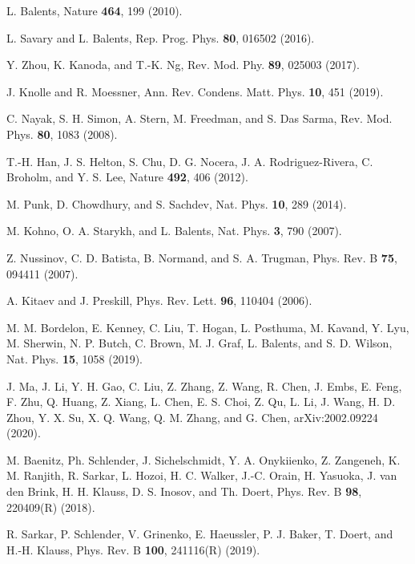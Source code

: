 \documentclass[aps,twocolumn,superscriptaddress,showpacs]{revtex4-1}
\begin{document}
\begin{thebibliography}{}

L. Balents, Nature {\bf 464}, 199 (2010).

L. Savary and L. Balents, Rep. Prog. Phys. {\bf 80}, 016502 (2016).

Y. Zhou, K. Kanoda, and T.-K. Ng, Rev. Mod. Phy. {\bf 89}, 025003 (2017).

J. Knolle and R. Moessner, Ann. Rev. Condens. Matt. Phys. {\bf 10}, 451 (2019).

C. Nayak, S. H. Simon, A. Stern, M. Freedman, and S. Das Sarma, Rev. Mod. Phys. {\bf 80}, 1083 (2008).

T.-H. Han, J. S. Helton, S. Chu, D. G. Nocera, J. A. Rodriguez-Rivera, C. Broholm, and Y. S. Lee, Nature {\bf 492}, 406 (2012).

M. Punk, D. Chowdhury, and S. Sachdev, Nat. Phys. {\bf 10}, 289 (2014).

M. Kohno, O. A. Starykh, and L. Balents, Nat. Phys. {\bf 3}, 790 (2007).

Z. Nussinov, C. D. Batista, B. Normand, and S. A. Trugman, Phys. Rev. B {\bf 75}, 094411 (2007).

A. Kitaev and J. Preskill, Phys. Rev. Lett. {\bf 96}, 110404 (2006).

M. M. Bordelon, E. Kenney, C. Liu, T. Hogan, L. Posthuma, M. Kavand, Y. Lyu, M. Sherwin, N. P.
Butch, C. Brown, M. J. Graf, L. Balents, and S. D. Wilson, Nat. Phys. {\bf 15}, 1058 (2019).

J. Ma, J. Li, Y. H. Gao, C. Liu, Z. Zhang, Z. Wang, R. Chen, J. Embs, E. Feng, F. Zhu, Q. Huang, Z. Xiang, L. Chen, E. S. Choi, Z. Qu, L. Li, J. Wang, H. D. Zhou, Y. X. Su, X. Q. Wang, Q. M. Zhang, and G. Chen, arXiv:2002.09224 (2020).

M. Baenitz, Ph. Schlender, J. Sichelschmidt, Y. A. Onykiienko, Z. Zangeneh, K. M. Ranjith, R. Sarkar, L. Hozoi, H. C. Walker, J.-C. Orain, H. Yasuoka, J. van den Brink, H. H. Klauss, D. S. Inosov, and Th. Doert, Phys. Rev. B {\bf 98}, 220409(R) (2018).

R. Sarkar, P. Schlender, V. Grinenko, E. Haeussler, P. J. Baker, T. Doert, and H.-H. Klauss, Phys. Rev. B {\bf 100}, 241116(R) (2019).


\end{thebibliography}
\end{document}

